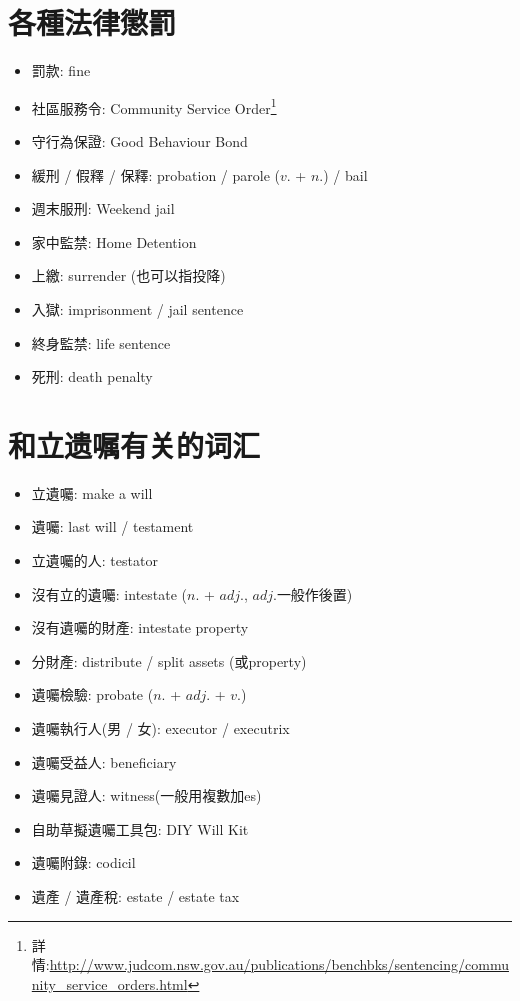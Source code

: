 \section{各種法律懲罰}
\begin{multicols}{2}
\begin{itemize}
  \itemsep0em
  \item 罰款: fine
  \item 社區服務令: Community Service Order\footnote{詳情:\url{http://www.judcom.nsw.gov.au/publications/benchbks/sentencing/community_service_orders.html}}
  \item 守行為保證: Good Behaviour Bond
  \item 緩刑 / 假釋 / 保釋: probation / parole ($v.$ + $n.$) / bail
  \item 週末服刑: Weekend jail
  \item 家中監禁: Home Detention
  \item 上繳: surrender (也可以指投降)
  \item 入獄: imprisonment / jail sentence
  \item 終身監禁: life sentence
  \item 死刑: death penalty
\end{itemize}
\end{multicols}

\section{和立遗嘱有关的词汇}
\begin{multicols}{2}
\begin{itemize}
  \itemsep0em
  \item 立遺囑: make a will
  \item 遺囑: last will / testament
  \item 立遺囑的人: testator
  \item 沒有立的遺囑: intestate ($n.$ + $adj.$, $adj.$一般作後置)
  \item 沒有遺囑的財產: intestate property
  \item 分財產: distribute / split assets (或property)
  \item 遺囑檢驗: probate ($n.$ + $adj.$ + $v.$)
  \item 遺囑執行人(男 / 女): executor / executrix
  \item 遺囑受益人: beneficiary
  \item 遺囑見證人: witness(一般用複數加es)
  \item 自助草擬遺囑工具包: DIY Will Kit
  \item 遺囑附錄: codicil
  \item 遺產 / 遺產稅: estate / estate tax
\end{itemize}
\end{multicols}

